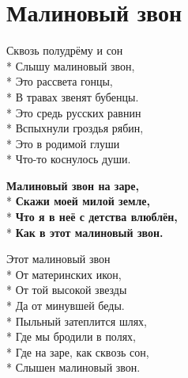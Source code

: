 \vspace{\fill}\newpage

\section{Малиновый звон}
\label{song:Малиновый_звон}

\medskip

\begin{minipage}{\linewidth}
Сквозь полудрёму и сон\\*
Слышу малиновый звон,\\*
Это рассвета гонцы, \\*
В травах звенят бубенцы.\\*
Это средь русских равнин\\*
Вспыхнули гроздья рябин,\\*
Это в родимой глуши\\*
Что-то коснулось души.\\
\end{minipage}\par\medskip\nobreak

\medskip

\begin{minipage}{\linewidth}
\hspace*{1.5em}\textbf{Малиновый звон на заре,}\\*
\hspace*{1.5em}\textbf{Скажи моей милой земле,}\\*
\hspace*{1.5em}\textbf{Что я в неё с детства влюблён,}\\*
\hspace*{1.5em}\textbf{Как в этот малиновый звон.}\\
\end{minipage}\par\medskip\nobreak

\medskip

\begin{minipage}{\linewidth}
Этот малиновый звон\\*
От материнских икон,\\*
От той высокой звезды\\*
Да от минувшей беды.\\*
Пыльный затеплится шлях,\\*
Где мы бродили в полях,\\*
Где на заре, как сквозь сон,\\*
Слышен малиновый звон.\\
\end{minipage}\par\medskip\nobreak

